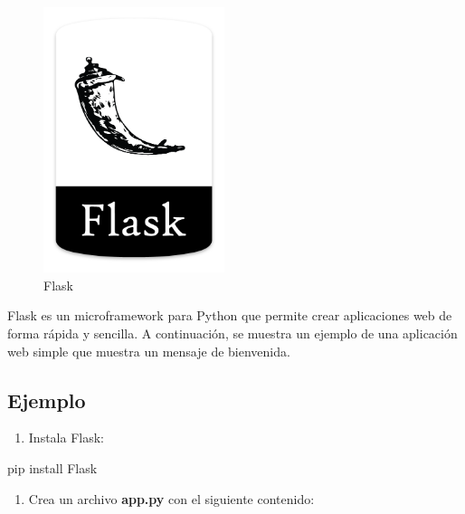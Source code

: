 \documentclass[
  a4paper,
  DIV=11,
  numbers=noendperiod,
  onepage,
  openany]{scrreprt}
\newenvironment{Shaded}{\begin{snugshade}}{\end{snugshade}}
\newcommand{\ExtensionTok}[1]{\textcolor[rgb]{0.00,0.23,0.31}{#1}}
\newcommand{\NormalTok}[1]{\textcolor[rgb]{0.00,0.23,0.31}{#1}}
\providecommand{\tightlist}{%
  \setlength{\itemsep}{0pt}\setlength{\parskip}{0pt}}\usepackage{longtable,booktabs,array}
\begin{document}
\begin{figure}[H]

{\centering \includegraphics[width=2.08333in,height=\textheight,keepaspectratio]{unidades/unidad7/./images/flask_logo.png}

}

\caption{Flask}

\end{figure}%

Flask es un microframework para Python que permite crear aplicaciones
web de forma rápida y sencilla. A continuación, se muestra un ejemplo de
una aplicación web simple que muestra un mensaje de bienvenida.

\subsection{Ejemplo}\label{ejemplo-1}

\begin{enumerate}
\def\labelenumi{\arabic{enumi}.}
\tightlist
\item
  Instala Flask:
\end{enumerate}

\begin{Shaded}
\begin{Highlighting}[]
\ExtensionTok{pip}\NormalTok{ install Flask}
\end{Highlighting}
\end{Shaded}

\begin{enumerate}
\def\labelenumi{\arabic{enumi}.}
\setcounter{enumi}{1}
\tightlist
\item
  Crea un archivo \textbf{app.py} con el siguiente contenido:
\end{enumerate}
\end{document}
